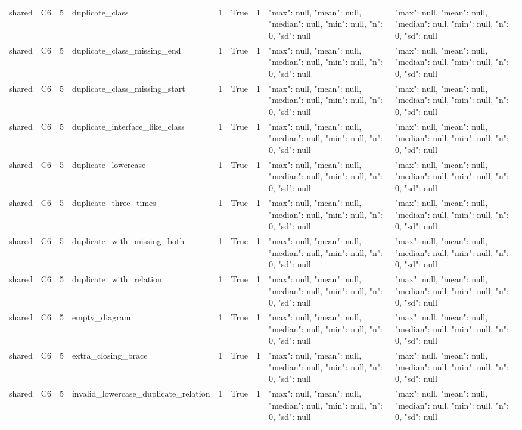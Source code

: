 \begin{tabular}{lllllllll}
shared & C6 & 5 & duplicate\_class & 1 & True & 1 & {"max": null, "mean": null, "median": null, "min": null, "n": 0, "sd": null} & {"max": null, "mean": null, "median": null, "min": null, "n": 0, "sd": null} \\
shared & C6 & 5 & duplicate\_class\_missing\_end & 1 & True & 1 & {"max": null, "mean": null, "median": null, "min": null, "n": 0, "sd": null} & {"max": null, "mean": null, "median": null, "min": null, "n": 0, "sd": null} \\
shared & C6 & 5 & duplicate\_class\_missing\_start & 1 & True & 1 & {"max": null, "mean": null, "median": null, "min": null, "n": 0, "sd": null} & {"max": null, "mean": null, "median": null, "min": null, "n": 0, "sd": null} \\
shared & C6 & 5 & duplicate\_interface\_like\_class & 1 & True & 1 & {"max": null, "mean": null, "median": null, "min": null, "n": 0, "sd": null} & {"max": null, "mean": null, "median": null, "min": null, "n": 0, "sd": null} \\
shared & C6 & 5 & duplicate\_lowercase & 1 & True & 1 & {"max": null, "mean": null, "median": null, "min": null, "n": 0, "sd": null} & {"max": null, "mean": null, "median": null, "min": null, "n": 0, "sd": null} \\
shared & C6 & 5 & duplicate\_three\_times & 1 & True & 1 & {"max": null, "mean": null, "median": null, "min": null, "n": 0, "sd": null} & {"max": null, "mean": null, "median": null, "min": null, "n": 0, "sd": null} \\
shared & C6 & 5 & duplicate\_with\_missing\_both & 1 & True & 1 & {"max": null, "mean": null, "median": null, "min": null, "n": 0, "sd": null} & {"max": null, "mean": null, "median": null, "min": null, "n": 0, "sd": null} \\
shared & C6 & 5 & duplicate\_with\_relation & 1 & True & 1 & {"max": null, "mean": null, "median": null, "min": null, "n": 0, "sd": null} & {"max": null, "mean": null, "median": null, "min": null, "n": 0, "sd": null} \\
shared & C6 & 5 & empty\_diagram & 1 & True & 1 & {"max": null, "mean": null, "median": null, "min": null, "n": 0, "sd": null} & {"max": null, "mean": null, "median": null, "min": null, "n": 0, "sd": null} \\
shared & C6 & 5 & extra\_closing\_brace & 1 & True & 1 & {"max": null, "mean": null, "median": null, "min": null, "n": 0, "sd": null} & {"max": null, "mean": null, "median": null, "min": null, "n": 0, "sd": null} \\
shared & C6 & 5 & invalid\_lowercase\_duplicate\_relation & 1 & True & 1 & {"max": null, "mean": null, "median": null, "min": null, "n": 0, "sd": null} & {"max": null, "mean": null, "median": null, "min": null, "n": 0, "sd": null} \\

\end{tabular}
